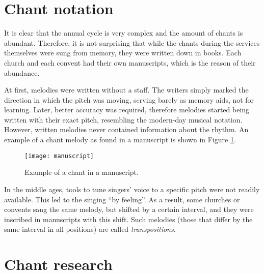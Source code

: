 \section{Chant notation}

It is clear that the annual cycle is very complex and the amount of chants is abundant. Therefore, it is not surprising that while the chants during the
services themselves were sung from memory, they were written down in books. Each church and each convent had their own manuscripts, which is the
reason of their abundance.

At first, melodies were written without a staff. The writers simply marked the direction in which the pitch was moving, serving barely as memory aids,
not for learning. Later, better accuracy was required,
therefore melodies started being written with their exact pitch, resembling the modern-day musical notation. However, written melodies never contained
information about the rhythm. An example of a chant melody as found in a manuscript is shown in Figure \ref{fig:chant}.

\begin{figure}[h]
\centering
\texttt{[image: manuscript]}
\caption{Example of a chant in a manuscript. \cite[id~007553]{cantus_db}}
\label{fig:chant}
\end{figure}

In the middle ages, tools to tune singers' voice to a specific pitch were not readily available. This led to the singing ``by feeling''. As a result,
some churches or convents sang the same melody, but shifted by a certain interval, and they were inscribed in manuscripts with this shift. Such melodies
(those that differ by the same interval in all positions) are called \emph{transpositions}.

\section{Chant research}


